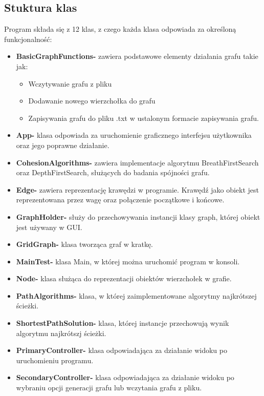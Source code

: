 \documentclass[10pt]{article}
\begin{document}
\subsection{Stuktura klas}
Program składa się z 12 klas, z czego każda klasa odpowiada za określoną funkcjonalność: 
\begin{itemize}
    \item \textbf{BasicGraphFunctions-} zawiera podstawowe elementy działania grafu takie jak:
    \begin{itemize}
        \item Wczytywanie grafu z pliku
        \item Dodawanie nowego wierzchołka do grafu
        \item Zapisywania grafu do pliku .txt w ustalonym formacie zapisywania grafu.
    \end{itemize}
    \item \textbf{App-} klasa odpowiada za uruchomienie graficznego interfejsu użytkownika oraz jego poprawne działanie.
    \item \textbf{CohesionAlgorithms-} zawiera implementacje algorytmu BreathFirstSearch oraz DepthFirstSearch, służących do badania spójności grafu.
    \item \textbf{Edge-} zawiera reprezentację krawędzi w programie. Krawędź jako obiekt jest reprezentowana przez wagę oraz połączenie początkowe i końcowe. 
    \item \textbf{GraphHolder-} służy do przechowywania instancji klasy graph, której obiekt jest używany w GUI.
    \item \textbf{GridGraph-} klasa tworząca graf w kratkę.
    \item \textbf{MainTest-} klasa Main, w której można uruchomić program w konsoli.
    \item \textbf{Node-} klasa służąca do reprezentacji obiektów wierzchołek w grafie.
    \item \textbf{PathAlgorithms-} klasa, w której zaimplementowane algorytmy najkrótszej ścieżki.
    \item \textbf{ShortestPathSolution-} klasa, której instancje przechowują wynik algorytmu najkrótszj ścieżki.
    \item \textbf{PrimaryController-} klasa odpowiadająca za działanie widoku po uruchomieniu programu.
    \item \textbf{SecondaryController-} klasa odpowiadająca za działanie widoku po wybraniu opcji generacji grafu lub wczytania grafu z pliku.
\end{itemize} 
\end{document}
